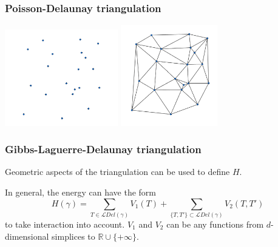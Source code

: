 \documentclass[c, 10pt]{beamer}
\begin{document}
\begin{frame}\frametitle{Poisson-Delaunay triangulation}


\begin{center}
\includegraphics[height = 4.2cm]{./FigureLayout/DelaunayBare.png}
\includegraphics[height = 4.4cm]{./FigureLayout/Delaunay.png}
\end{center}
\end{frame}



\begin{frame}\frametitle{Gibbs-Laguerre-Delaunay triangulation}
\vspace{4mm}

Geometric aspects of the triangulation can be used to define $H$.

In general, the energy can have the form
$$H(\gamma) = \sum_{T \in \mathcal LDel(\gamma)} V_1(T) + \sum_{\{T,T'\} \subset \mathcal LDel (\gamma)} V_2(T,T')$$
to take interaction into account. 
$V_1$ and $V_2$ can be any functions from $d$-dimensional simplices to $\mathbb R \cup \{+ \infty \}$. \newline

\end{frame}
\end{document}
